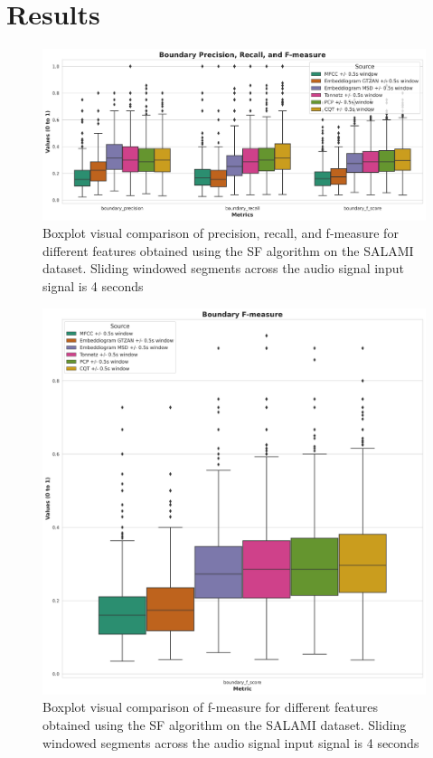 \chapter{Results}



\begin{figure}
    \centering
    \includegraphics[width=\textwidth]{figures/images/metrics.png}
    \caption[Metric comparison for different audio features. Boxplot]{Boxplot visual comparison of precision, recall, and f-measure for different features obtained using the SF algorithm \cite{sf} on the SALAMI dataset. Sliding windowed segments across the audio signal input signal is 4 seconds}
    \label{fig:boxplotmetrics}
\end{figure}

\begin{figure}
    \centering
    \includegraphics[width=\textwidth]{figures/images/boudaryfscore.png}
    \caption[F-measure comparison for different audio features. Boxplot]{Boxplot visual comparison of f-measure for different features obtained using the SF algorithm \cite{sf} on the SALAMI dataset. Sliding windowed segments across the audio signal input signal is 4 seconds}
    \label{fig:boxplotfmeasure}
\end{figure}

\newpage


